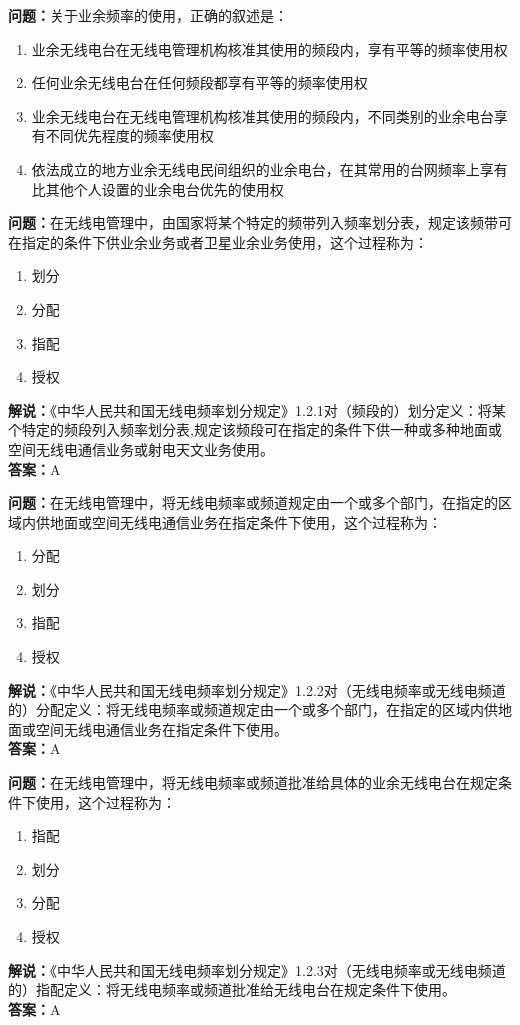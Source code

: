 \textbf{问题：}关于业余频率的使用，正确的叙述是：
\begin{enumerate}[label=\Alph*), leftmargin=3em]
	\item 业余无线电台在无线电管理机构核准其使用的频段内，享有平等的频率使用权
	\item 任何业余无线电台在任何频段都享有平等的频率使用权
	\item 业余无线电台在无线电管理机构核准其使用的频段内，不同类别的业余电台享有不同优先程度的频率使用权
	\item 依法成立的地方业余无线电民间组织的业余电台，在其常用的台网频率上享有比其他个人设置的业余电台优先的使用权
\end{enumerate}

\textbf{问题：}在无线电管理中，由国家将某个特定的频带列入频率划分表，规定该频带可在指定的条件下供业余业务或者卫星业余业务使用，这个过程称为：
\begin{enumerate}[label=\Alph*), leftmargin=3em]
	\item 划分
	\item 分配
	\item 指配
	\item 授权
\end{enumerate}
\textbf{解说：}《中华人民共和国无线电频率划分规定》1.2.1对（频段的）划分定义：将某个特定的频段列入频率划分表,规定该频段可在指定的条件下供一种或多种地面或空间无线电通信业务或射电天文业务使用。\\
\textbf{答案：}A

\textbf{问题：}在无线电管理中，将无线电频率或频道规定由一个或多个部门，在指定的区域内供地面或空间无线电通信业务在指定条件下使用，这个过程称为：
\begin{enumerate}[label=\Alph*), leftmargin=3em]
	\item 分配
	\item 划分
	\item 指配
	\item 授权
\end{enumerate}
\textbf{解说：}《中华人民共和国无线电频率划分规定》1.2.2对（无线电频率或无线电频道的）分配定义：将无线电频率或频道规定由一个或多个部门，在指定的区域内供地面或空间无线电通信业务在指定条件下使用。\\
\textbf{答案：}A

\textbf{问题：}在无线电管理中，将无线电频率或频道批准给具体的业余无线电台在规定条件下使用，这个过程称为：
\begin{enumerate}[label=\Alph*), leftmargin=3em]
	\item 指配
	\item 划分
	\item 分配
	\item 授权
\end{enumerate}
\textbf{解说：}《中华人民共和国无线电频率划分规定》1.2.3对（无线电频率或无线电频道的）指配定义：将无线电频率或频道批准给无线电台在规定条件下使用。\\
\textbf{答案：}A

